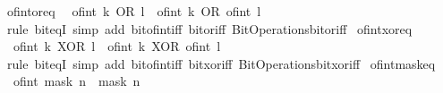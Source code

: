 \begin{isabellebody}
\endisatagproof
{\isafoldproof}%
%
\isadelimproof
\isanewline
%
\endisadelimproof
\isanewline
{}\isamarkupfalse%
\ of{\isacharunderscore}{\kern0pt}int{\isacharunderscore}{\kern0pt}or{\isacharunderscore}{\kern0pt}eq{\isacharcolon}{\kern0pt}\isanewline
\ \ {\isacartoucheopen}of{\isacharunderscore}{\kern0pt}int\ {\isacharparenleft}{\kern0pt}k\ OR\ l{\isacharparenright}{\kern0pt}\ {\isacharequal}{\kern0pt}\ of{\isacharunderscore}{\kern0pt}int\ k\ OR\ of{\isacharunderscore}{\kern0pt}int\ l{\isacartoucheclose}\isanewline
%
\isadelimproof
\ \ %
\endisadelimproof
%
\isatagproof
{}\isamarkupfalse%
\ {\isacharparenleft}{\kern0pt}rule\ bit{\isacharunderscore}{\kern0pt}eqI{\isacharparenright}{\kern0pt}\ {\isacharparenleft}{\kern0pt}simp\ add{\isacharcolon}{\kern0pt}\ bit{\isacharunderscore}{\kern0pt}of{\isacharunderscore}{\kern0pt}int{\isacharunderscore}{\kern0pt}iff\ bit{\isacharunderscore}{\kern0pt}or{\isacharunderscore}{\kern0pt}iff\ Bit{\isacharunderscore}{\kern0pt}Operations{\isachardot}{\kern0pt}bit{\isacharunderscore}{\kern0pt}or{\isacharunderscore}{\kern0pt}iff{\isacharparenright}{\kern0pt}%
\endisatagproof
{\isafoldproof}%
%
\isadelimproof
\isanewline
%
\endisadelimproof
\isanewline
{}\isamarkupfalse%
\ of{\isacharunderscore}{\kern0pt}int{\isacharunderscore}{\kern0pt}xor{\isacharunderscore}{\kern0pt}eq{\isacharcolon}{\kern0pt}\isanewline
\ \ {\isacartoucheopen}of{\isacharunderscore}{\kern0pt}int\ {\isacharparenleft}{\kern0pt}k\ XOR\ l{\isacharparenright}{\kern0pt}\ {\isacharequal}{\kern0pt}\ of{\isacharunderscore}{\kern0pt}int\ k\ XOR\ of{\isacharunderscore}{\kern0pt}int\ l{\isacartoucheclose}\isanewline
%
\isadelimproof
\ \ %
\endisadelimproof
%
\isatagproof
{}\isamarkupfalse%
\ {\isacharparenleft}{\kern0pt}rule\ bit{\isacharunderscore}{\kern0pt}eqI{\isacharparenright}{\kern0pt}\ {\isacharparenleft}{\kern0pt}simp\ add{\isacharcolon}{\kern0pt}\ bit{\isacharunderscore}{\kern0pt}of{\isacharunderscore}{\kern0pt}int{\isacharunderscore}{\kern0pt}iff\ bit{\isacharunderscore}{\kern0pt}xor{\isacharunderscore}{\kern0pt}iff\ Bit{\isacharunderscore}{\kern0pt}Operations{\isachardot}{\kern0pt}bit{\isacharunderscore}{\kern0pt}xor{\isacharunderscore}{\kern0pt}iff{\isacharparenright}{\kern0pt}%
\endisatagproof
{\isafoldproof}%
%
\isadelimproof
\isanewline
%
\endisadelimproof
\isanewline
{}\isamarkupfalse%
\ of{\isacharunderscore}{\kern0pt}int{\isacharunderscore}{\kern0pt}mask{\isacharunderscore}{\kern0pt}eq{\isacharcolon}{\kern0pt}\isanewline
\ \ {\isacartoucheopen}of{\isacharunderscore}{\kern0pt}int\ {\isacharparenleft}{\kern0pt}mask\ n{\isacharparenright}{\kern0pt}\ {\isacharequal}{\kern0pt}\ mask\ n{\isacartoucheclose}\isanewline

\end{isabellebody}
